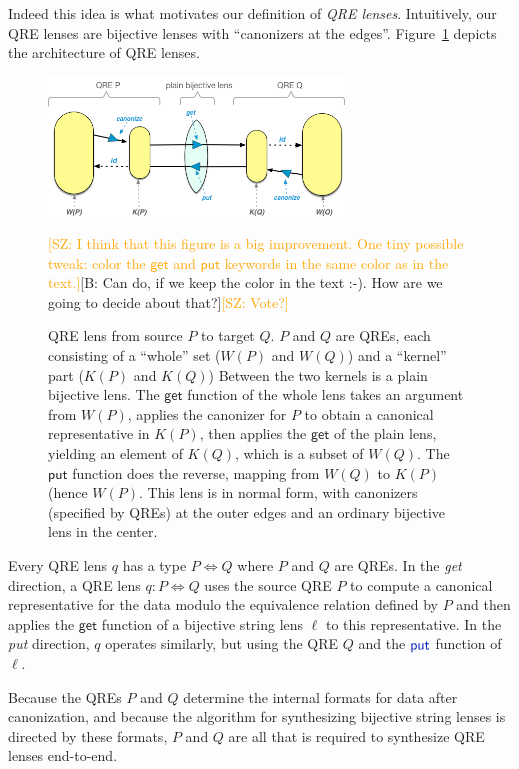 \documentclass[acmsmall,screen]{acmart}
\newcommand{\FINISH}[3]{\ifdraft\textcolor{#1}{[#2: #3]}\fi}
\newcommand{\bcp}[1]{\FINISH{dkred}{B}{#1}}
\newcommand{\saz}[1]{\FINISH{orange}{SZ}{#1}}
\newcommand{\kw}[1]{\textcolor{dkblue}{\ensuremath{\mathsf{#1}}}}
\newcommand{\lput}{\ensuremath{\kw{put}}}
\begin{document}
Indeed this idea is what motivates our definition of {\em QRE lenses}.
Intuitively, our QRE lenses are bijective lenses with ``canonizers at the
edges''.
Figure~\ref{fig:attheedges} depicts the architecture of QRE lenses.
\begin{figure}[t]
\centering
\includegraphics[width=0.7\textwidth]{QREs}
\caption{QRE lens from source $P$ to target $Q$.  $P$ and $Q$ are QREs, each
  consisting of a ``whole'' set ($W(P)$ and $W(Q)$) and a ``kernel'' part
  ($K(P)$ and $K(Q)$) Between the two kernels is a plain bijective lens.
  The \kw{get} function of the whole lens takes an argument from $W(P)$,
  applies the canonizer for $P$ to obtain a canonical representative in
  $K(P)$, then applies the \kw{get} of the plain lens, yielding an element
  of $K(Q)$, which is a subset of $W(Q)$.  The \kw{put} function does the
  reverse, mapping from $W(Q)$ to $K(P)$ (hence $W(P)$.  This lens is in
  normal form, with canonizers (specified by QREs) at the outer edges and an
  ordinary bijective lens in the center. }
\iflater
\saz{I think that this figure is a
  big improvement.  One tiny possible tweak: color the \kw{get} and \kw{put}
  keywords in the same color as in the text.}\bcp{Can do, if we keep the
  color in the text :-).  How are we going to decide about that?}\saz{Vote?}
\fi
\label{fig:attheedges}
\end{figure}
Every QRE lens $q$ has a type $P \Leftrightarrow Q$ where $P$ and $Q$
are QREs. In the {\em get} direction, a QRE lens $q: P \Leftrightarrow Q$ uses
the source QRE $P$ to compute a canonical representative for the data modulo
the equivalence relation defined by $P$ and then applies the \kw{get} function
of a bijective string lens $\ell$ to this representative. In the {\em put}
direction, $q$ operates similarly, but using the QRE $Q$ and the $\lput$
function of $\ell$.

Because the QREs $P$ and $Q$ determine the internal formats for data after
canonization, and because the algorithm for synthesizing bijective string
lenses is directed by these formats, $P$ and $Q$ are all that is required to
synthesize QRE lenses end-to-end. 
\end{document}
